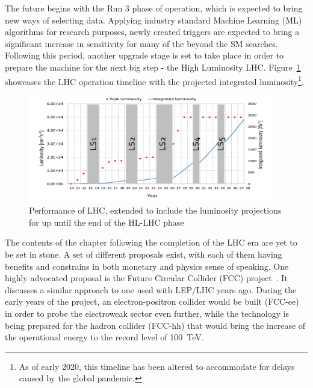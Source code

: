 \hspace{10pt} The future begins with the Run 3 phase of operation, which is expected to bring new ways of selecting data. Applying industry standard Machine Learning (ML) algorithms for research purposes, newly created triggers are expected to bring a significant increase in sensitivity for many of the beyond the SM searches. Following this period, another upgrade stage is set to take place in order to prepare the machine for the next big step - the High Luminosity LHC. Figure~\ref{fig:lhc_lumi} showcases the LHC operation timeline with the projected integrated luminosity\footnote{As of early 2020, this timeline has been altered to accommodate for delays caused by the global pandemic.}. 

\begin{figure}[htbp]
  \centering
    \includegraphics[width=0.95\textwidth]{CMS_experiment/LHC_integrated_lumi.png}
  \caption[Performance of LHC, extended to include the luminosity projections for up until the end of the HL-LHC phase.]{Performance of LHC, extended to include the luminosity projections for up until the end of the HL-LHC phase~\cite{ref:Schmidt_2016}}
  \label{fig:lhc_lumi}
\end{figure}


\hspace{10pt} The contents of the chapter following the completion of the LHC era are yet to be set in stone. A set of different proposals exist, with each of them having benefits and constrains in both monetary and physics sense of speaking. One highly advocated proposal is the Future Circular Collider (FCC) project~\cite{FCC_CDR}. It discusses a similar approach to one used with LEP/LHC years ago. During the early years of the project, an electron-positron collider would be built (FCC-ee) in order to probe the electroweak sector even further, while the technology is being prepared for the hadron collider (FCC-hh) that would bring the increase of the operational energy to the record level of 100~TeV. 



